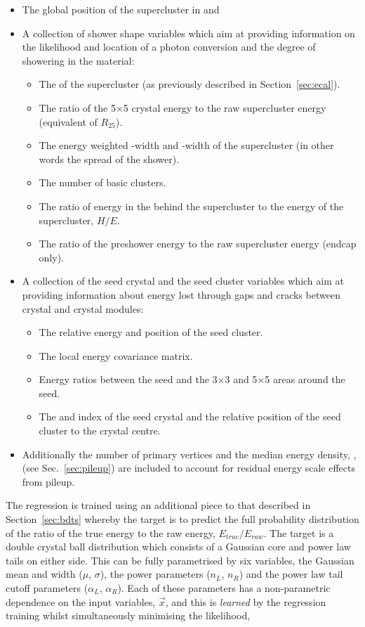 \begin{itemize}
  \item The global position of the supercluster in \eta and \phi
  \item A collection of shower shape variables which aim at providing information on the likelihood and location of a photon conversion and the degree of showering in the material:
  \begin{itemize}
    \item The \rnine of the supercluster (as previously described in Section~\ref{sec:ecal}).
    \item The ratio of the 5$\times$5 crystal energy to the raw supercluster energy (equivalent of $R_{25}$).
    \item The energy weighted \eta-width and \phi-width of the supercluster (in other words the spread of the shower).
    \item The number of basic clusters.
    \item The ratio of energy in the \HCAL behind the supercluster to the \ECAL energy of the supercluster, $H/E$.
    \item The ratio of the preshower energy to the raw supercluster energy (endcap only).
  \end{itemize}
  \item A collection of the seed crystal and the seed cluster variables which aim at providing information about energy lost through gaps and cracks between crystal and crystal modules:
  \begin{itemize}
    \item The relative energy and position of the seed cluster.
    \item The local energy covariance matrix.
    \item Energy ratios between the seed and the 3$\times$3 and 5$\times$5 areas around the seed.
    \item The \eta and \phi index of the seed crystal and the relative position of the seed cluster to the crystal centre. 
  \end{itemize}
  \item Additionally the number of primary vertices and the median energy density, \rho, (see Sec.~\ref{sec:pileup}) are included to account for residual energy scale effects from pileup.
\end{itemize}

The regression is trained using an additional piece to that described in Section~\ref{sec:bdts} whereby the target is to predict the full probability distribution of the ratio of the true energy to the raw energy, $E_{true}/E_{raw}$. The target is a double crystal ball distribution which consists of a Gaussian core and power law tails on either side. This can be fully parametrised by six variables, the Gaussian mean and width ($\mu$, $\sigma$), the power parameters ($n_{L}$, $n_{R}$) and the power law tail cutoff parameters ($\alpha_{L}$, $\alpha_{R}$). Each of these parameters has a non-parametric dependence on the input variables, $\vec{x}$, and this is \emph{learned} by the regression training whilst simultaneously minimising the likelihood,

